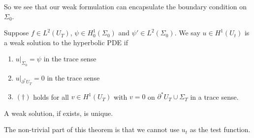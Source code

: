 \documentclass[a4paper]{article}
\begin{document}
So we see that our weak formulation can encapsulate the boundary condition on $\Sigma_0$.

\begin{defi}
  Suppose $f \in L^2(U_T)$, $\psi \in H_0^1(\Sigma_0)$ and $\psi' \in L^2(\Sigma_0)$. We say $u \in H^1(U_t)$ is a weak solution to the hyperbolic PDE if
  \begin{enumerate}
    \item $u|_{\Sigma_0} = \psi$ in the trace sense
    \item $u|_{\partial^* U_T} = 0$ in the trace sense
    \item $(\dagger)$ holds for all $v \in H^1(U_T)$ with $v = 0$ on $\partial^* U_T \cup \Sigma_T$ in a trace sense.
  \end{enumerate}
\end{defi}

\begin{thm}
  A weak solution, if exists, is unique.
\end{thm}
The non-trivial part of this theorem is that we cannot use $u_t$ as the test function.
\end{document}
